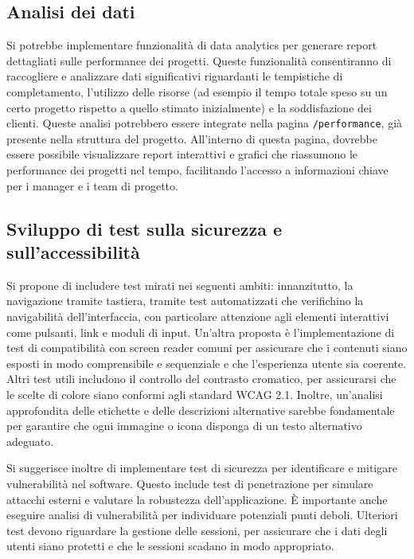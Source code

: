 \documentclass[target=bach,aauheader=,style=]{thud}
\begin{document}
\subsection{Analisi dei dati}
Si potrebbe implementare funzionalità di data analytics per generare report dettagliati sulle performance dei progetti. Queste funzionalità consentiranno di raccogliere e analizzare dati significativi riguardanti le tempistiche di completamento, l'utilizzo delle risorse (ad esempio il tempo totale speso su un certo progetto rispetto a quello stimato inizialmente) e la soddisfazione dei clienti. Queste analisi potrebbero essere integrate nella pagina \texttt{/performance}, già presente nella struttura del progetto. All'interno di questa pagina, dovrebbe essere possibile visualizzare report interattivi e grafici che riassumono le performance dei progetti nel tempo, facilitando l'accesso a informazioni chiave per i manager e i team di progetto.

\subsection{Sviluppo di test sulla sicurezza e sull'accessibilità}
Si propone di includere test mirati nei seguenti ambiti: innanzitutto, la navigazione tramite tastiera, tramite test automatizzati che verifichino la navigabilità dell'interfaccia, con particolare attenzione agli elementi interattivi come pulsanti, link e moduli di input. Un'altra proposta è l'implementazione di test di compatibilità con screen reader comuni per assicurare che i contenuti siano esposti in modo comprensibile e sequenziale e che l'esperienza utente sia coerente. Altri test utili includono il controllo del contrasto cromatico, per assicurarsi che le scelte di colore siano conformi agli standard WCAG 2.1\cite{wcag21}. Inoltre, un'analisi approfondita delle etichette e delle descrizioni alternative sarebbe fondamentale per garantire che ogni immagine o icona disponga di un testo alternativo adeguato. 

\noindent Si suggerisce inoltre di implementare test di sicurezza per identificare e mitigare vulnerabilità nel software. Questo include test di penetrazione per simulare attacchi esterni e valutare la robustezza dell'applicazione. È importante anche eseguire analisi di vulnerabilità per individuare potenziali punti deboli. Ulteriori test devono riguardare la gestione delle sessioni, per assicurare che i dati degli utenti siano protetti e che le sessioni scadano in modo appropriato.
\end{document}
